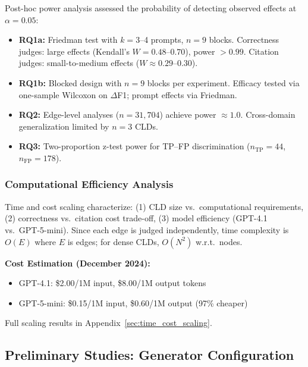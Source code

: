 Post-hoc power analysis assessed the probability of detecting observed effects at $\alpha = 0.05$:
\begin{itemize}[noitemsep]
    \item \textbf{RQ1a:} Friedman test with $k=3$--4 prompts, $n=9$ blocks. Correctness judges: large effects (Kendall's $W = 0.48$--$0.70$), power $>0.99$. Citation judges: small-to-medium effects ($W \approx 0.29$--$0.30$).
    \item \textbf{RQ1b:} Blocked design with $n=9$ blocks per experiment. Efficacy tested via one-sample Wilcoxon on $\Delta$F1; prompt effects via Friedman.
    \item \textbf{RQ2:} Edge-level analyses ($n = 31{,}704$) achieve power $\approx 1.0$. Cross-domain generalization limited by $n = 3$ CLDs.
    \item \textbf{RQ3:} Two-proportion z-test power for TP--FP discrimination ($n_{\text{TP}}=44$, $n_{\text{FP}}=178$).
\end{itemize}

\subsubsection{Computational Efficiency Analysis}
\label{sec:computational_efficiency}

Time and cost scaling characterize: (1) CLD size vs.\ computational requirements, (2) correctness vs.\ citation cost trade-off, (3) model efficiency (GPT-4.1 vs.\ GPT-5-mini). Since each edge is judged independently, time complexity is $O(E)$ where $E$ is edges; for dense CLDs, $O(N^2)$ w.r.t.\ nodes.

\textbf{Cost Estimation (December 2024):}
\begin{itemize}[noitemsep]
    \item GPT-4.1: \$2.00/1M input, \$8.00/1M output tokens
    \item GPT-5-mini: \$0.15/1M input, \$0.60/1M output (97\% cheaper)
\end{itemize}

Full scaling results in Appendix~\ref{sec:time_cost_scaling}.

\subsection{Preliminary Studies: Generator Configuration}
\label{sec:preliminary_studies}

